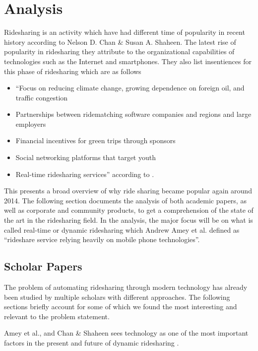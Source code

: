 \section{Analysis}
Ridesharing is an activity which have had different time of popularity in recent history according to Nelson D. Chan \& Susan A. Shaheen\cite{doi:10.1080/01441647.2011.621557}.
The latest rise of popularity in ridesharing they attribute to the organizational capabilities of technologies such as the Internet and smartphones.
They also list insentiences for this phase of ridesharing which are as follows 
\begin{itemize}
  \item ``Focus on reducing climate change, growing dependence on foreign oil, and traffic congestion
  \item Partnerships between ridematching software companies and regions and large employers
  \item Financial incentives for green trips through sponsors
  \item Social networking platforms that target youth
  \item Real-time ridesharing services'' according to \cite{doi:10.1080/01441647.2011.621557}.
\end{itemize}

This presents a broad overview of why ride sharing became popular again around 2014.
The following section documents the analysis of both academic papers, as well as corporate and community products, to get a comprehension of the state of the art in the ridesharing field.
In the analysis, the major focus will be on what is called real-time or dynamic ridesharing which Andrew Amey et al. defined as ``rideshare service relying heavily on mobile phone technologies''\cite{amey2011real}.

\subsection{Scholar Papers}
The problem of automating ridesharing through modern technology has already been studied by multiple scholars with different approaches. The following sections briefly account for some of which we found the most interesting and relevant to the problem statement. 

Amey et al., and Chan \& Shaheen sees technology as one of the most important factors in the present and future of dynamic ridesharing \cite{doi:10.1080/01441647.2011.621557, amey2011real}.


